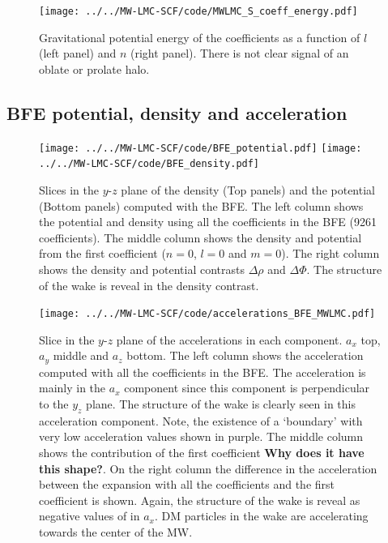 \documentclass[14pt]{article}
\begin{document}
\begin{figure}[H]
  \centering
  \texttt{[image: ../../MW-LMC-SCF/code/MWLMC\_S\_coeff\_energy.pdf]}
  \caption{Gravitational potential energy of the coefficients as a function of
  $l$ (left panel) and $n$ (right panel). There
  is not clear signal of an oblate or prolate halo.}\label{fig:MW_LMC_coeff}
\end{figure}


\subsection{BFE potential, density and acceleration}


\begin{figure}[H]
  \centering
  \texttt{[image: ../../MW-LMC-SCF/code/BFE\_potential.pdf]}
  \texttt{[image: ../../MW-LMC-SCF/code/BFE\_density.pdf]}
  \caption{Slices in the $y$-$z$ plane of the density (Top panels) 
  and the potential (Bottom panels) computed with the BFE. The
  left column shows the potential and density using all the coefficients
  in the BFE (9261 coefficients). The middle column shows the density and potential from the
  first coefficient ($n=0$, $l=0$ and $m=0$). The right column shows the
  density and potential contrasts $\Delta \rho$ and $\Delta \Phi$. The
  structure of the wake is reveal in the density contrast.}

\end{figure}



\begin{figure}[H]
  \centering
  \texttt{[image: ../../MW-LMC-SCF/code/accelerations\_BFE\_MWLMC.pdf]}
  \caption{Slice in the $y$-$z$ plane of the accelerations in each component.
  $a_x$ top, $a_y$ middle and $a_z$ bottom. The left column shows the
  acceleration computed with all the coefficients in the BFE. The acceleration
  is mainly in the $a_x$ component since this component is perpendicular to the
  $y_z$ plane. The structure of the wake is clearly seen in this acceleration
  component. Note, the existence of a `boundary' with very low acceleration
  values shown in purple. The middle column shows the contribution of the first
  coefficient \textbf{Why does it have this shape?}. On the right column the
  difference in the acceleration between the expansion with all the coefficients
  and the first coefficient is shown. Again, the structure of the wake is reveal 
  as negative values of in $a_x$. DM particles in the wake are accelerating
  towards the center of the MW.}
\end{figure}
\end{document}
